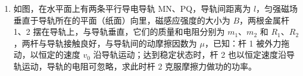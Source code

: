 \documentclass[\gkver]{gaokaozhenti}
\begin{document}
\begin{enumerate}
{过路灯 P 和人头顶的直线与地面的交点 M 为 $t$ 时刻人头顶影子的位置，如图所示，OM 为人头顶影子到 O 点的距离，由几何关系，有
$\frac{h}{OM}=\frac{l}{OM-OS}$ ②

解①②得 $OM=\frac{hv}{h-l}t$ ③

因 OM 与时间成正比，故人头顶的影子作匀速运动。

（2）由图可知，在时刻 $t$，人影的长度为 $SM$，由几何关系，有 $SM=OM-OS$ ④

由①③④式得
$SM=\frac{lv}{h-l}t$ ⑤

可见影长 $SM$ 与时间 $t$ 成正比，所以影长随时间的变化率 $k=\frac{lv}{h-l}$ ⑥

}

\item
如图，在水平面上有两条平行导电导轨 MN、PQ，导轨间距离为 $l$，匀强磁场垂直于导轨所在的平面（纸面）向里，磁感应强度的大小为 $B$，两根金属杆 1、2 摆在导轨上，与导轨垂直，它们的质量和电阻分别为 $m_{1}$、$m_{2}$ 和 $R_{1}$、$R_{2}$，两杆与导轨接触良好，与导轨间的动摩擦因数为 $\mu$，已知：杆 1 被外力拖动，以恒定的速度 $v_{0}$ 沿导轨运动；达到稳定状态时，杆 2 也以恒定速度沿导轨运动，导轨的电阻可忽略，求此时杆 2 克服摩擦力做功的功率。

\onepicture[align=right, w=7.56cm]{}
\end{enumerate}
\end{document}
